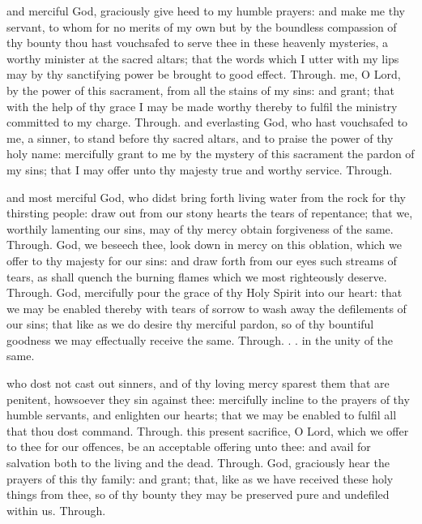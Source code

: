 \begin{multicols}{2}
 and merciful God, graciously give heed to my humble prayers: and make me thy servant, to whom for no merits of my own but by the boundless compassion of thy bounty thou hast vouchsafed to serve thee in these heavenly mysteries, a worthy minister at the sacred altars; that the words which I utter with my lips may by thy sanctifying power be brought to good effect. Through.
 me, O Lord, by the power of this sacrament, from all the stains of my sins: and grant; that with the help of thy grace I may be made worthy thereby to fulfil the ministry committed to my charge. Through.
 and everlasting God, who hast vouchsafed to me, a sinner, to stand before thy sacred altars, and to praise the power of thy holy name: mercifully grant to me by the mystery of this sacrament the pardon of my sins; that I may offer unto thy majesty true and worthy service. Through.

 and most merciful God, who didst bring forth living water from the rock for thy thirsting people: draw out from our stony hearts the tears of repentance; that we, worthily lamenting our sins, may of thy mercy obtain forgiveness of the same. Through.
 God, we beseech thee, look down in mercy on this oblation, which we offer to thy majesty for our sins: and draw forth from our eyes such streams of tears, as shall quench the burning flames which we most righteously deserve. Through.
 God, mercifully pour the grace of thy Holy Spirit into our heart: that we may be enabled thereby with tears of sorrow to wash away the defilements of our sins; that like as we do desire thy merciful pardon, so of thy bountiful goodness we may effectually receive the same. Through. . . in the unity of the same.

 who dost not cast out sinners, and of thy loving mercy sparest them that are penitent, howsoever they sin against thee: mercifully incline to the prayers of thy humble servants, and enlighten our hearts; that we may be enabled to fulfil all that thou dost command. Through.
 this present sacrifice, O Lord, which we offer to thee for our offences, be an acceptable offering unto thee: and avail for salvation both to the living and the dead. Through.
 God, graciously hear the prayers of this thy family: and grant; that, like as we have received these holy things from thee, so of thy bounty they may be preserved pure and undefiled within us. Through.


\end{multicols}
